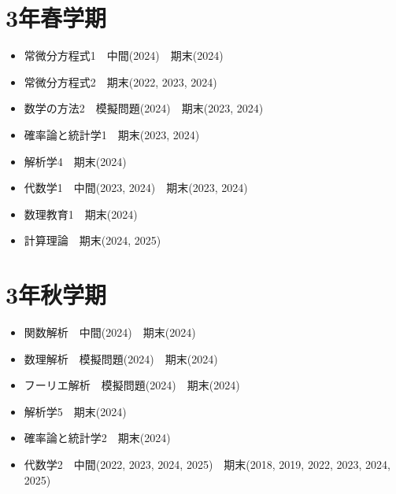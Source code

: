 \documentclass{jlreq}
\begin{document}
\section{3年春学期}
\begin{itemize}
\item 常微分方程式1　中間(2024)　期末(2024)
\item 常微分方程式2　期末(2022, 2023, 2024)
\item 数学の方法2　模擬問題(2024)　期末(2023, 2024)
\item 確率論と統計学1　期末(2023, 2024)
\item 解析学4　期末(2024)
\item 代数学1　中間(2023, 2024)　期末(2023, 2024)
\item 数理教育1　期末(2024)
\item 計算理論　期末(2024, 2025)
\end{itemize}
\section{3年秋学期}
\begin{itemize}
\item 関数解析　中間(2024)　期末(2024)
\item 数理解析　模擬問題(2024)　期末(2024)
\item フーリエ解析　模擬問題(2024)　期末(2024)
\item 解析学5　期末(2024)
\item 確率論と統計学2　期末(2024)
\item 代数学2　中間(2022, 2023, 2024, 2025)　期末(2018, 2019, 2022, 2023, 2024, 2025)
\end{itemize}
\end{document}
